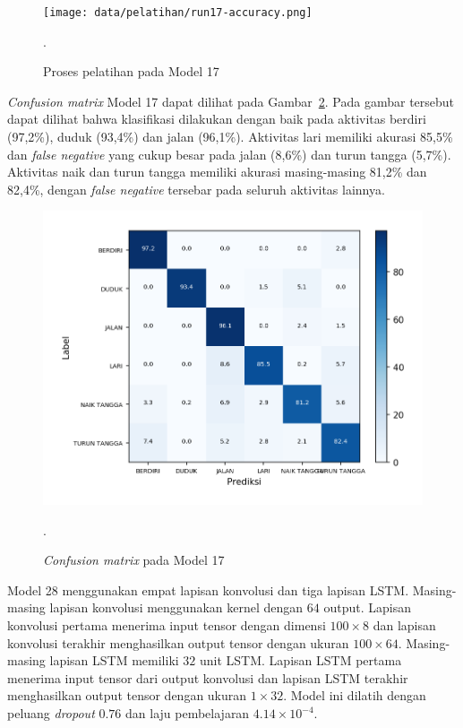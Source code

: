 \begin{figure}[h!]
    \centering
    \texttt{[image: data/pelatihan/run17-accuracy.png]}
    \caption{Proses pelatihan pada Model 17}.
    \label{gambar:run17-training}
\end{figure}

\textit{Confusion matrix} Model 17 dapat dilihat pada Gambar~\ref{gambar:run17-confusion-martix}. Pada gambar tersebut dapat dilihat bahwa klasifikasi dilakukan dengan baik pada aktivitas berdiri (97,2\%), duduk (93,4\%) dan jalan (96,1\%). Aktivitas lari memiliki akurasi 85,5\% dan \textit{false negative} yang cukup besar pada jalan (8,6\%) dan turun tangga (5,7\%). Aktivitas naik dan turun tangga memiliki akurasi masing-masing 81,2\% dan 82,4\%, dengan \textit{false negative} tersebar pada seluruh aktivitas lainnya.

\begin{figure}[h!]
    \centering
    \includegraphics[width=13cm]{gambar/hasil-pembahasan/run17-confusion-matrix.png}
    \caption{\textit{Confusion matrix} pada Model 17}.
    \label{gambar:run17-confusion-martix}
\end{figure}

Model 28 menggunakan empat lapisan konvolusi dan tiga lapisan LSTM\@. Masing-masing lapisan konvolusi menggunakan kernel dengan $64$ output. Lapisan konvolusi pertama menerima input tensor dengan dimensi $100 \times 8$ dan lapisan konvolusi terakhir menghasilkan output tensor dengan ukuran $100 \times 64$. Masing-masing lapisan LSTM memiliki $32$ unit LSTM\@. Lapisan LSTM pertama menerima input tensor dari output konvolusi dan lapisan LSTM terakhir menghasilkan output tensor dengan ukuran $1 \times 32$. Model ini dilatih dengan peluang \textit{dropout} $0.76$ dan laju pembelajaran $4.14 \times 10^{-4}$.

